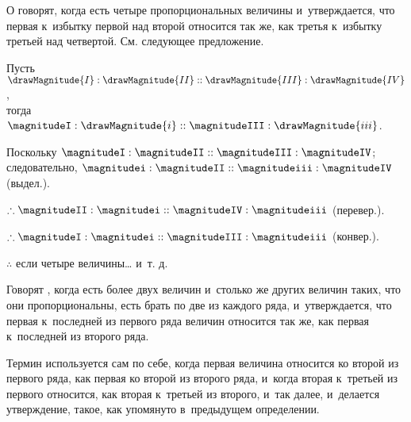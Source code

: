 \documentclass{byrne-book}
\begin{document}
\label{def:V.XVII} %
О  говорят, когда есть четыре пропорциональных величины и~утверждается, что первая к~избытку первой над второй относится так же, как третья к~избытку третьей над четвертой. См. следующее предложение.


\vfill\pagebreak


\label{prop:V.E}

\begin{center}
Пусть $\drawMagnitude{I} : \drawMagnitude{II} :: \drawMagnitude{III} : \drawMagnitude{IV}$,\\
тогда $\magnitudeI : \drawMagnitude{i} :: \magnitudeIII : \drawMagnitude{iii}$.

Поскольку $\magnitudeI : \magnitudeII :: \magnitudeIII : \magnitudeIV$;\\
следовательно, $\magnitudei : \magnitudeII :: \magnitudeiii : \magnitudeIV$ (выдел.).

$\therefore \magnitudeII : \magnitudei :: \magnitudeIV : \magnitudeiii$ (перевер.).

$\therefore \magnitudeI : \magnitudei :: \magnitudeIII : \magnitudeiii$ (конвер.).

$\therefore$ если четыре величины… и~т. д.
\end{center}

\label{def:V.XVIII}
Говорят , когда есть более двух величин и~столько же других величин таких, что они пропорциональны, есть брать по две из каждого ряда, и~утверждается, что первая к~последней из первого ряда величин относится так же, как первая к~последней из второго ряда.


\vfill\pagebreak


\label{def:V.XIX}
\def\varA{\textcolor{byred}{A}}
\def\varB{\textcolor{byred}{B}}
\def\varC{\textcolor{byyellow}{C}}
\def\varD{\textcolor{byyellow}{D}}
\def\varE{\textcolor{byblue}{E}}
\def\varF{\textcolor{byblue}{F}}
\def\varL{\textcolor{byred}{L}}
\def\varM{\textcolor{byred}{M}}
\def\varN{\textcolor{byyellow}{N}}
\def\varO{\textcolor{byyellow}{O}}
\def\varP{\textcolor{byblue}{P}}
\def\varQ{\textcolor{byblue}{Q}}
Термин  используется сам по себе, когда первая величина относится ко второй из первого ряда, как первая ко второй из второго ряда, и~когда вторая к~третьей из первого относится, как вторая к~третьей из второго, и~так далее, и~делается утверждение, такое, как упомянуто в~предыдущем определении.
\end{document}
